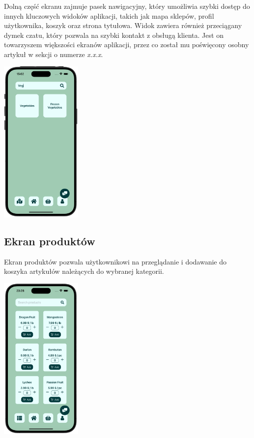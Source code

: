 Dolną część ekranu zajmuje pasek nawigacyjny, który umożliwia szybki dostęp do innych kluczowych widoków aplikacji, takich jak mapa sklepów, profil użytkownika, koszyk oraz strona tytułowa. Widok zawiera również przeciągany dymek czatu, który pozwala na szybki kontakt z obsługą klienta. Jest on towarzyszem większości ekranów aplikacji, przez co został mu poświęcony osobny artykuł w sekcji o numerze \textit{x.x.x}.

\begin{center} 
    \includegraphics[width=0.3\textwidth]{images/front/categories_filtered.png} 
\end{center}

\subsection{Ekran produktów}

Ekran produktów pozwala użytkownikowi na przeglądanie i dodawanie do koszyka artykułów należących do wybranej kategorii. 

\begin{center} 
    \includegraphics[width=0.3\textwidth]{images/front/products_page.png}  
\end{center}

